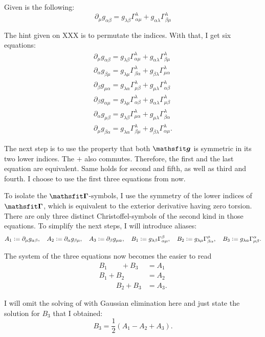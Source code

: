 \newcommand\equ[3]{\partial_{#1} g_{{#2}{#3}} = g_{\lambda{#3}} \Gamma^\lambda_{{#2}{#1}} + g_{{#2}\lambda} \Gamma^\lambda_{{#3}{#1}}}

Given is the following:
\[
    \equ\mu\alpha\beta
\]

The hint given on XXX is to permutate the indices. With that, I get six
equations:
\begin{gather*}
    \equ\mu\alpha\beta \\
    \equ\alpha\beta\mu \\
    \equ\beta\mu\alpha \\
    \equ\beta\alpha\mu \\
    \equ\alpha\mu\beta \\
    \equ\mu\beta\alpha.
\end{gather*}

The next step is to use the property that both $\tens g$ is symmetric in its
two lower indices. The $+$ also commutes. Therefore, the first and the last
equation are equivalent. Same holds for second and fifth, as well as third and
fourth. I choose to use the first three equations from now.

To isolate the $\tens \Gamma$-symbols, I use the symmetry of the lower indices
of $\tens \Gamma$, which is equivalent to the exterior derivative having zero
torsion. There are only three distinct Christoffel-symbols of the second kind
in those equations. To simplify the next steps, I will introduce aliases:
\[
    A_1 := \partial_\mu g_{\alpha\beta}
    ,\quad
    A_2 := \partial_\alpha g_{\beta\mu}
    ,\quad
    A_3 := \partial_\beta g_{\mu\alpha}
    ,\quad
    B_1 := g_{\lambda\beta} \Gamma^{\beta}_{{\alpha}{\mu}}
    ,\quad
    B_2 := g_{\lambda\mu} \Gamma^{\mu}_{{\beta}{\alpha}}
    ,\quad
    B_3 := g_{\lambda\alpha} \Gamma^{\alpha}_{{\mu}{\beta}}.
\]

The system of the three equations now becomes the easier to read
\begin{align*}
    B_1 \phantom{+B_2} + B_3 &= A_1 \\
    B_1 + B_2 \phantom{+ B_3} &= A_2 \\
    \phantom{B_1 +} B_2 + B_3 &= A_3.
\end{align*}

I will omit the solving of with Gaussian elimination here and just state the
solution for $B_3$ that I obtained:
\[
    B_3 = \frac12 (A_1 - A_2 + A_3).
\]

